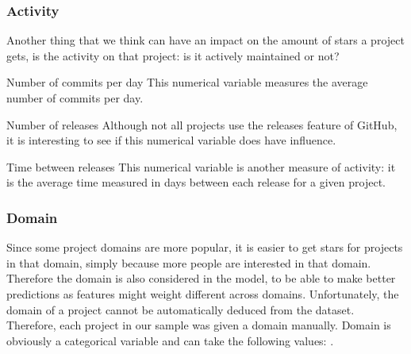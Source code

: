 
    \subsubsection{Activity}
        Another thing that we think can have an impact on the amount of stars a project gets, is the activity on that project: is it actively maintained or not?
    \begin{LaTeXdescription}
        \item[Number of commits per day]
            This numerical variable measures the average number of commits per day.
        \item[Number of releases]
            Although not all projects use the releases feature of GitHub, it is interesting to see if this numerical variable does have influence.
        \item[Time between releases]
            This numerical variable is another measure of activity: it is the average time measured in days between each release for a given project.
    \end{LaTeXdescription}


 
    \subsubsection{Domain}
        Since some project domains are more popular, it is easier to get stars for projects in that domain, simply because more people are interested in that domain.
        Therefore the domain is also considered in the model, to be able to make better predictions as features might weight different across domains.
        Unfortunately, the domain of a project cannot be automatically deduced from the dataset. 
        Therefore, each project in our sample was given a domain manually. Domain is obviously a categorical variable and can take the following values: .

    
